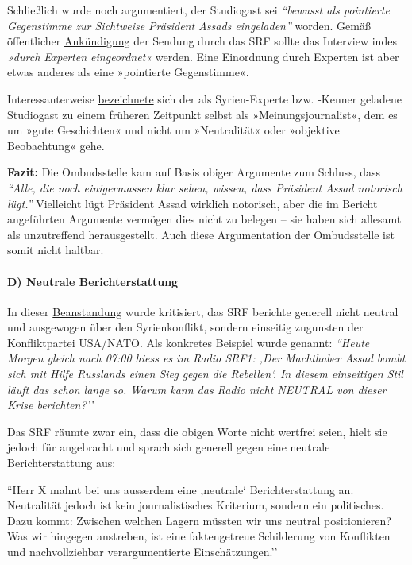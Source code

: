 Schließlich wurde noch argumentiert, der Studiogast sei \emph{``bewusst
als pointierte Gegenstimme zur Sichtweise Präsident Assads eingeladen''}
worden. Gemäß öffentlicher
\href{http://www.srf.ch/news/international/assad-ist-nur-noch-an-der-macht-weil-er-so-brutal-ist}{Ankündigung}
der Sendung durch das SRF sollte das Interview indes \emph{»durch
Experten eingeordnet«} werden. Eine Einordnung durch Experten ist aber
etwas anderes als eine »pointierte Gegenstimme«.

Interessanterweise
\href{https://swprs.org/2017/03/01/der-kriegsreporter/}{bezeichnete}
sich der als Syrien-Experte bzw. -Kenner geladene Studiogast zu einem
früheren Zeitpunkt selbst als »Meinungsjournalist«, dem es um »gute
Geschichten« und nicht um »Neutralität« oder »objektive Beobachtung«
gehe.

\textbf{Fazit:} Die Ombudsstelle kam auf Basis obiger Argumente zum
Schluss, dass \emph{``Alle, die noch einigermassen klar sehen, wissen,
dass Präsident Assad notorisch lügt.''} Vielleicht lügt Präsident Assad
wirklich notorisch, aber die im Bericht angeführten Argumente vermögen
dies nicht zu belegen -- sie haben sich allesamt als unzutreffend
herausgestellt. Auch diese Argumentation der Ombudsstelle ist somit
nicht haltbar.

\hypertarget{d-neutrale-berichterstattung}{%
\paragraph{D) Neutrale
Berichterstattung}\label{d-neutrale-berichterstattung}}

In dieser
\href{https://www.srgd.ch/de/aktuelles/news/2017/01/04/radio-nachrichtensendung-heute-morgen-uber-syrienkonflikt-beanstandet/}{Beanstandung}
wurde kritisiert, das SRF berichte generell nicht neutral und ausgewogen
über den Syrienkonflikt, sondern einseitig zugunsten der Konfliktpartei
USA/NATO. Als konkretes Beispiel wurde genannt: \emph{``Heute Morgen
gleich nach 07:00 hiess es im Radio SRF1: ‚Der Machthaber Assad bombt
sich mit Hilfe Russlands einen Sieg gegen die Rebellen`. In diesem
einseitigen Stil läuft das schon lange so. Warum kann das Radio nicht
NEUTRAL von dieser Krise berichten?''}

Das SRF räumte zwar ein, dass die obigen Worte nicht wertfrei seien,
hielt sie jedoch für angebracht und sprach sich generell gegen eine
neutrale Berichterstattung aus:

``Herr X mahnt bei uns ausserdem eine ‚neutrale` Berichterstattung an.
Neutralität jedoch ist kein journalistisches Kriterium, sondern ein
politisches. Dazu kommt: Zwischen welchen Lagern müssten wir uns neutral
positionieren? Was wir hingegen anstreben, ist eine faktengetreue
Schilderung von Konflikten und nachvollziehbar verargumentierte
Einschätzungen.''

